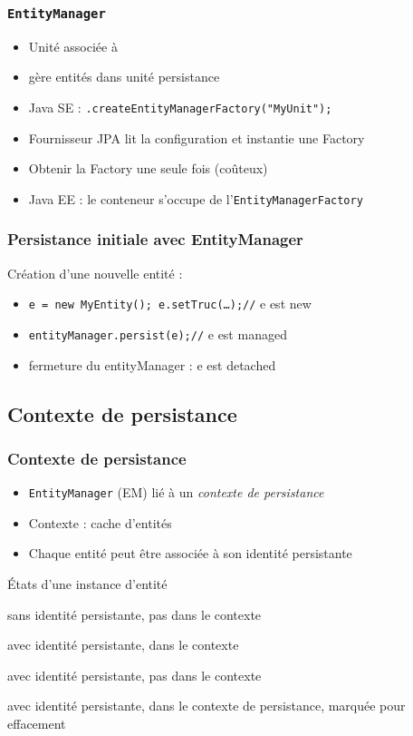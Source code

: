\documentclass[english, french]{beamer}
\begin{document}
\begin{frame}
	\frametitle{\texttt{EntityManager}}
	\begin{itemize}
		\item Unité associée à 
		\item {} gère entités dans unité persistance
		\item Java SE : {\small \texttt{.createEntityManagerFactory("MyUnit");}}
		\item Fournisseur JPA lit la configuration et instantie une Factory
		\item Obtenir la Factory une seule fois (coûteux)
		\item Java EE : le conteneur s’occupe de l’\texttt{EntityManagerFactory}
	\end{itemize}
\end{frame}

\begin{frame}
	\frametitle{Persistance initiale avec EntityManager}
	Création d’une nouvelle entité :
	\begin{itemize}
		\item \texttt{e = new MyEntity(); e.setTruc(…);//} e est \og{}new\fg{}
		\item \texttt{entityManager.persist(e);//} e est \og{}managed\fg{}
		\item fermeture du entityManager : e est \og{}detached\fg{}
	\end{itemize}
\end{frame}

\subsection{Contexte de persistance}
\begin{frame}
	\frametitle{Contexte de persistance}
	\begin{itemize}
		\item \texttt{EntityManager} (EM) lié à un \emph{contexte de persistance}
		\item Contexte : cache d’entités
		\item Chaque entité peut être associée à son identité persistante
	\end{itemize}
	\begin{block}{États d’une instance d’entité}
		\begin{description}[detached]
			\item[new] sans identité persistante, pas dans le contexte
			\item[managed] avec identité persistante, dans le contexte
			\item[detached] avec identité persistante, pas dans le contexte
			\item[removed] avec identité persistante, dans le contexte de persistance, marquée pour effacement
		\end{description}
	\end{block}
\end{frame}
\end{document}
